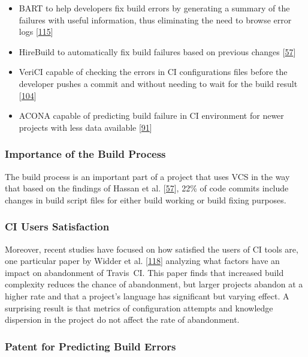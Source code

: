\documentclass[]{book}
\providecommand{\tightlist}{%
  \setlength{\itemsep}{0pt}\setlength{\parskip}{0pt}}
\begin{document}
\begin{itemize}
\tightlist
\item
  BART to help developers fix build errors by generating a summary of
  the failures with useful information, thus eliminating the need to
  browse error logs {[}\protect\hyperlink{ref-vassallo2018break}{115}{]}
\item
  HireBuild to automatically fix build failures based on previous
  changes {[}\protect\hyperlink{ref-hassan2018hirebuild}{57}{]}
\item
  VeriCI capable of checking the errors in CI configurations files
  before the developer pushes a commit and without needing to wait for
  the build result
  {[}\protect\hyperlink{ref-santolucito2018statically}{104}{]}
\item
  ACONA capable of predicting build failure in CI environment for newer
  projects with less data available
  {[}\protect\hyperlink{ref-ni2018acona}{91}{]}
\end{itemize}

\subsubsection{Importance of the Build
Process}\label{importance-of-the-build-process}

The build process is an important part of a project that uses VCS in the
way that based on the findings of Hassan et al.
{[}\protect\hyperlink{ref-hassan2018hirebuild}{57}{]}, 22\% of code
commits include changes in build script files for either build working
or build fixing purposes.

\subsubsection{CI Users Satisfaction}\label{ci-users-satisfaction}

Moreover, recent studies have focused on how satisfied the users of CI
tools are, one particular paper by Widder et al.
{[}\protect\hyperlink{ref-widder2018m}{118}{]} analyzing what factors
have an impact on abandonment of Travis~CI. This paper finds that
increased build complexity reduces the chance of abandonment, but larger
projects abandon at a higher rate and that a project's language has
significant but varying effect. A surprising result is that metrics of
configuration attempts and knowledge dispersion in the project do not
affect the rate of abandonment.

\subsubsection{Patent for Predicting Build
Errors}\label{patent-for-predicting-build-errors}
\end{document}
